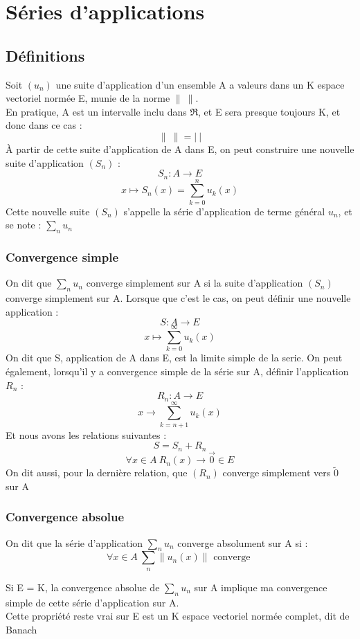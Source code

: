 \chapter{Séries d'applications}
\section{Définitions}
\begin{de}
Soit $(u_n)$ une suite d'application d'un ensemble A a valeurs dans un K espace vectoriel normée E, munie de la norme $\parallel~\parallel$.\\
En pratique, A est un intervalle inclu dans $\Re$, et E sera presque toujours K, et donc dans ce cas : 
$$\parallel~\parallel = |~ |$$
À partir de cette suite d'application de A dans E, on peut construire une nouvelle suite d'application $(S_n)$ : 
$$S_n : A \rightarrow E$$
$$x \mapsto S_n(x) = \sum_{k=0}^n u_k(x)$$
Cette nouvelle suite $(S_n)$ s'appelle la série d'application de terme général $u_n$, et se note : $\underset{n} \sum u_n$
\end{de}
\subsection{Convergence simple}
\begin{de}
On dit que $\underset{n} \sum u_n$ converge simplement sur A si la suite d'application $(S_n)$ converge simplement sur A. Lorsque que c'est le cas, on peut définir une nouvelle application :
$$S : A\rightarrow E$$
$$x \mapsto \sum_{k=0}^{\infty} u_k(x)$$
On dit que S, application de A dans E, est la limite simple de la serie. On peut également, lorsqu'il y a convergence simple de la série sur A, définir l'application $R_n$ : 
$$R_n : A \rightarrow E$$
$$x \rightarrow \sum_{k=n+1}^{\infty} u_k(x)$$
Et nous avons les relations suivantes :
$$S = S_n + R_n$$
$$\forall x \in A~ R_n(x) \rightarrow \overrightarrow{0} \in E$$
On dit aussi, pour la dernière relation, que $(R_n)$ converge simplement vers $\tilde{0}$ sur A
\end{de}
\subsection{Convergence absolue}
\begin{de}
On dit que la série d'application $\underset{n}\sum u_n$ converge absolument sur A si :
$$\forall x \in A~ \sum_n \parallel u_n(x)\parallel \mbox{ converge }$$ 
\end{de}
\begin{prop}
Si E = K, la convergence absolue de $\underset{n}\sum u_n$ sur A implique ma convergence simple de cette série d'application sur A.\\
Cette propriété reste vrai sur E est un K espace vectoriel normée complet, dit de Banach 
\end{prop}
